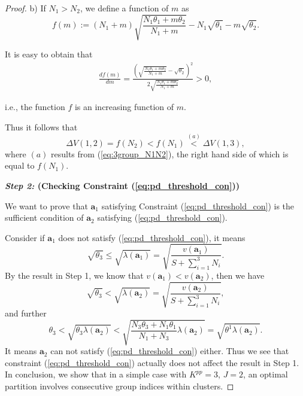 \documentclass[twocolumn,10pt,twosided]{IEEEtran}
\begin{document}
\begin{proof}
b) If $N_1> N_2$, we define a function of $m$ as
$$f(m):=(N_1+m)\sqrt{\frac{N_1\theta_1+m\theta_2}{N_1+m}}-N_1\sqrt{\theta_1}-m\sqrt{\theta_2}.$$

It is easy to obtain that
\begin{eqnarray}
\frac{df(m)}{dm}=\frac{\left(\sqrt{\frac{N_1\theta_1+m\theta_2}{N_1+m}}-\sqrt{\theta_2}\right)^2}{2\sqrt{\frac{N_1\theta_1+m\theta_2}{N_1+m}}}>0,\nonumber
\end{eqnarray}

i.e., the function $f$ is an increasing function of $m$.

Thus it follows that
\begin{equation*}
    \Delta V(1,2)=f(N_2)<f(N_1)\overset{(a)}{<}\Delta V(1,3),
\end{equation*}
where $(a)$ results from (\ref{eq:3group_N1N2}), the right hand side
of which is equal to $f(N_1)$.

\textbf{\emph{Step 2:} (Checking Constraint (\ref{eq:pd_threshold_con}))}

We want to prove that $\boldsymbol{a}_1$ satisfying Constraint (\ref{eq:pd_threshold_con}) is the sufficient condition of $\boldsymbol{a}_2$ satisfying (\ref{eq:pd_threshold_con}).

Consider if  $\boldsymbol{a}_1$ does not satisfy (\ref{eq:pd_threshold_con}), it means
\begin{equation*}
\sqrt{\theta_3}\le \sqrt{\lambda(\boldsymbol{a}_1)} =\sqrt{\frac{v(\boldsymbol{a}_1)}{S+\sum_{i=1}^3N_i}}.
\end{equation*}
By the result in Step 1, we know that $v(\boldsymbol{a}_1)<v(\boldsymbol{a}_2)$, then we have
\begin{equation*}
\sqrt{\theta_3}< \sqrt{\lambda(\boldsymbol{a}_2)} =\sqrt{\frac{v(\boldsymbol{a}_2)}{S+\sum_{i=1}^3N_i}},
\end{equation*}
and further
\begin{equation*}
{\theta_3}< \sqrt{\theta_3\lambda(\boldsymbol{a}_2)}<\sqrt{\frac{N_3\theta_3+N_1\theta_1}{N_1+N_3}\lambda(\boldsymbol{a}_2)} =\sqrt{\theta^1\lambda(\boldsymbol{a}_2)}.
\end{equation*}
It means $\boldsymbol{a}_2$ can not satisfy (\ref{eq:pd_threshold_con}) either. Thus we see that constraint (\ref{eq:pd_threshold_con}) actually does not affect the result in Step 1.
In conclusion, we show that in a simple case with $K^{pp}=3$, $J=2$,  an optimal partition involves consecutive group indices within clusters.
\end{proof}
\end{document}

